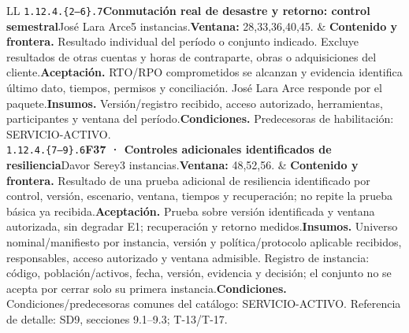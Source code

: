 \begin{longtable}{L{\tabcolsep\relax}L{\tabcolsep\relax}}
\texttt{1.\allowbreak{}12.\allowbreak{}4.\allowbreak{}\{2--6\}.\allowbreak{}7}\newline{}\textbf{Conmutación real de desastre y retorno: control semestral}\newline{}José Lara Arce\newline{}5 instancias.\newline{}\textbf{Ventana:} 28,33,36,40,45. & \textbf{Contenido y frontera.} Resultado individual del período o conjunto indicado. Excluye resultados de otras cuentas y horas de contraparte, obras o adquisiciones del cliente.\newline{}\textbf{Aceptación.} RTO/RPO comprometidos se alcanzan y evidencia identifica último dato, tiempos, permisos y conciliación. José Lara Arce responde por el paquete.\newline{}\textbf{Insumos.} Versión/registro recibido, acceso autorizado, herramientas, participantes y ventana del período.\newline{}\textbf{Condiciones.} Predecesoras de habilitación: SERVICIO-ACTIVO.\\\hline
\texttt{1.\allowbreak{}12.\allowbreak{}4.\allowbreak{}\{7--9\}.\allowbreak{}6}\newline{}\textbf{F37 · Controles adicionales identificados de resiliencia}\newline{}Davor Serey\newline{}3 instancias.\newline{}\textbf{Ventana:} 48,52,56. & \textbf{Contenido y frontera.} Resultado de una prueba adicional de resiliencia identificado por control, versión, escenario, ventana, tiempos y recuperación; no repite la prueba básica ya recibida.\newline{}\textbf{Aceptación.} Prueba sobre versión identificada y ventana autorizada, sin degradar E1; recuperación y retorno medidos.\newline{}\textbf{Insumos.} Universo nominal/manifiesto por instancia, versión y política/protocolo aplicable recibidos, responsables, acceso autorizado y ventana admisible. Registro de instancia: código, población/activos, fecha, versión, evidencia y decisión; el conjunto no se acepta por cerrar solo su primera instancia.\newline{}\textbf{Condiciones.} Condiciones/predecesoras comunes del catálogo: SERVICIO-ACTIVO. Referencia de detalle: SD9, secciones 9.1--9.3; T-13/T-17.\\\hline

\end{longtable}
